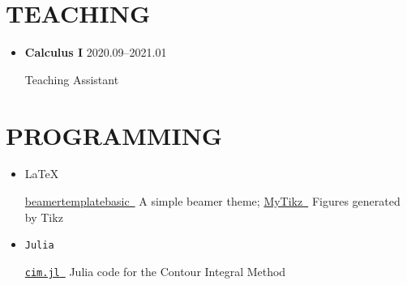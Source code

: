 \documentclass[11pt, letterpaper]{article}
\newcommand{\iconhref}[2]{\href{#1}{#2\ \footnotesize\faExternalLink*}}
\begin{document}
	\section{TEACHING}
	\begin{itemize}
		\item \textbf{Calculus I} \hfill 2020.09--2021.01
		
		Teaching Assistant
	\end{itemize}

	\section{PROGRAMMING}
	\begin{itemize}
		\item \LaTeX
		
		\iconhref{https://github.com/peakfind/beamertemplatebasic}{beamertemplatebasic} A simple beamer theme; \iconhref{https://github.com/peakfind/MyTikz}{MyTikz} Figures generated by Tikz 
		\item \texttt{Julia}
		
		\iconhref{https://github.com/peakfind/cim}{\texttt{cim.jl}} Julia code for the Contour Integral Method
	\end{itemize}
\end{document}
